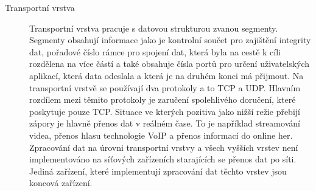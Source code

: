 \begin{description}
\item[Transportní vrstva]\label{layers:transport} %
Transportní vrstva pracuje s datovou strukturou zvanou segmenty.
Segmenty obsahují informace jako je kontrolní součet pro zajištění integrity dat,
pořadové číslo rámce pro spojení dat, která byla na cestě k cíli rozdělena na více částí a také obsahuje čísla portů
pro určení uživatelských aplikací, která data odeslala a která je na druhém konci má přijmout.
Na transportní vrstvě se používají dva protokoly a to TCP a UDP. Hlavním rozdílem mezi těmito protokoly
je zaručení spolehlivého doručení, které poskytuje pouze TCP. Situace ve kterých pozitiva jako
nižší režie přebijí zápory je hlavně přenos dat v reálném čase. To je například streamování videa,
přenos hlasu technologie VoIP a přenos informací do online her.
Zpracování dat na úrovni transportní vrstvy a všech vyšších vrstev není implementováno na síťových
zařízeních starajících se přenos dat po síti. Jediná zařízení, které implementují zpracování
dat těchto vrstev jsou koncová zařízení.

\end{description}

